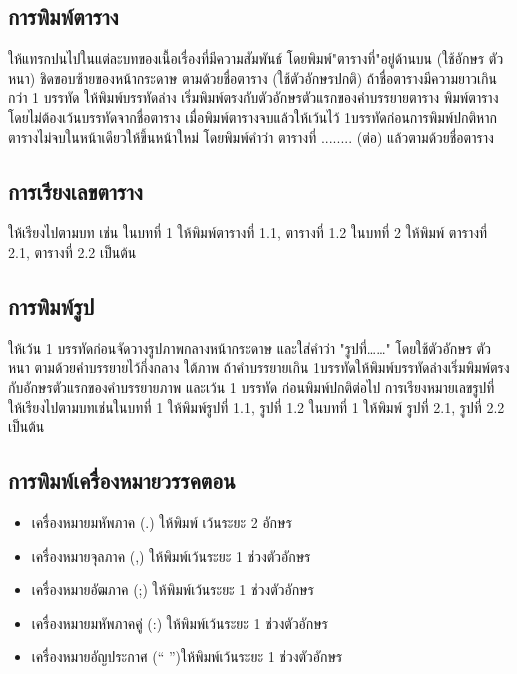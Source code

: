 \subsection{การพิมพ์ตาราง}

ให้แทรกปนไปในแต่ละบทของเนื้อเรื่องที่มีความสัมพันธ์ โดยพิมพ์"ตารางที่"อยู่ด้านบน (ใช้อักษร ตัวหนา) ชิดขอบซ้ายของหน้ากระดาษ ตามด้วยชื่อตาราง (ใช้ตัวอักษรปกติ) ถ้าชื่อตารางมีความยาวเกินกว่า 1 บรรทัด ให้พิมพ์บรรทัดล่าง เริ่มพิมพ์ตรงกับตัวอักษรตัวแรกของคำบรรยายตาราง พิมพ์ตารางโดยไม่ต้องเว้นบรรทัดจากชื่อตาราง เมื่อพิมพ์ตารางจบแล้วให้เว้นไว้ 1บรรทัดก่อนการพิมพ์ปกติหากตารางไม่จบในหน้าเดียวให้ขึ้นหน้าใหม่ โดยพิมพ์คำว่า ตารางที่ ........ (ต่อ) แล้วตามด้วยชื่อตาราง

\subsection{การเรียงเลขตาราง}

ให้เรียงไปตามบท เช่น ในบทที่ 1 ให้พิมพ์ตารางที่ 1.1, ตารางที่ 1.2 ในบทที่ 2 ให้พิมพ์ ตารางที่ 2.1, ตารางที่ 2.2 เป็นต้น

\subsection{การพิมพ์รูป}

ให้เว้น 1 บรรทัดก่อนจัดวางรูปภาพกลางหน้ากระดาษ และใส่คำว่า "รูปที่……" โดยใช้ตัวอักษร ตัวหนา ตามด้วยคำบรรยายไว้กึ่งกลาง ใต้ภาพ ถ้าคำบรรยายเกิน 1บรรทัดให้พิมพ์บรรทัดล่างเริ่มพิมพ์ตรงกับอักษรตัวแรกของคำบรรยายภาพ และเว้น 1 บรรทัด ก่อนพิมพ์ปกติต่อไป การเรียงหมายเลขรูปที่ ให้เรียงไปตามบทเช่นในบทที่ 1 ให้พิมพ์รูปที่ 1.1, รูปที่ 1.2 ในบทที่ 1 ให้พิมพ์ รูปที่ 2.1, รูปที่ 2.2 เป็นต้น

\subsection{การพิมพ์เครื่องหมายวรรคตอน}
\begin{itemize}
    \item เครื่องหมายมหัพภาค	(.) 	ให้พิมพ์	เว้นระยะ 	2 อักษร
    \item เครื่องหมายจุลภาค	(,)	ให้พิมพ์เว้นระยะ 	1 ช่วงตัวอักษร
    \item เครื่องหมายอัฒภาค	(;)	ให้พิมพ์เว้นระยะ 	1 ช่วงตัวอักษร
    \item เครื่องหมายมหัพภาคคู่	(:)	ให้พิมพ์เว้นระยะ	1 ช่วงตัวอักษร
    \item เครื่องหมายอัญประกาศ	(“  ”)ให้พิมพ์เว้นระยะ 		1 ช่วงตัวอักษร
\end{itemize}


